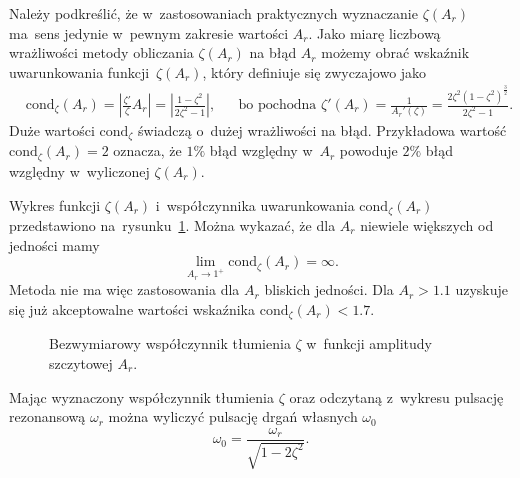 \documentclass[paper=a4,DIV=12]{lpas}
\begin{document}
\begin{appendices}
  Należy podkreślić, że w~zastosowaniach praktycznych wyznaczanie $\zeta(A_r)$
  ma~sens jedynie w~pewnym zakresie wartości $A_r$.
  Jako miarę liczbową wrażliwości metody obliczania $\zeta(A_r)$ na błąd $A_r$
  możemy obrać wskaźnik uwarunkowania funkcji~$\zeta(A_r)$, który definiuje się
  zwyczajowo jako
  \begin{equation}
    \begin{aligned}
      &
      \text{cond}_{\zeta}(A_r)
        = \left|\frac{\zeta'}{\zeta} A_r\right|
        = \left|\frac{1-\zeta^2}{2\zeta^2-1}\right|,
      &&
      \text{bo pochodna }\zeta'(A_r)
        = \frac{1}{A_r'(\zeta)}
        = \frac{2 \zeta^2 (1-\zeta^2)^{\frac{3}{2}}}{2 \zeta^2 - 1}.
      &
    \end{aligned}
    \label{eq:HY93S}
  \end{equation}
  Duże wartości $\text{cond}_{\zeta}$ świadczą o~dużej wrażliwości na błąd.
  Przykładowa wartość $\text{cond}_{\zeta}(A_r) = 2$ oznacza, że $1\%$ błąd
  względny w~$A_r$ powoduje $2\%$ błąd względny w~wyliczonej $\zeta(A_r)$.

  Wykres funkcji $\zeta(A_r)$ i~współczynnika uwarunkowania
  $\text{cond}_{\zeta}(A_r)$ przedstawiono na~rysunku~\ref{fig:5O32M}. Można
  wykazać, że dla $A_r$ niewiele większych od jedności mamy
  \begin{equation}
    \lim_{A_r \to 1^{+}} \text{cond}_{\zeta}(A_r) = \infty.
    \label{eq:77ILN}
  \end{equation}
  Metoda nie ma więc zastosowania dla $A_r$ bliskich jedności. Dla $A_r > 1.1$
  uzyskuje się już akceptowalne wartości wskaźnika $\text{cond}_{\zeta}(A_r) < 1.7$.
  \begin{figure}[H]
    \centering
    
    \caption{Bezwymiarowy współczynnik tłumienia $\zeta$ w~funkcji amplitudy
             szczytowej $A_r$.}
    \label{fig:5O32M}
  \end{figure}

  Mając wyznaczony współczynnik tłumienia $\zeta$ oraz odczytaną z~wykresu
  pulsację rezonansową $\omega_r$ można wyliczyć pulsację drgań własnych
  $\omega_0$
  \begin{equation}
    \omega_0 = \frac{\omega_r}{\sqrt{1 - 2\zeta^2}}.
    \label{eq:GIWGJ}
  \end{equation}


\end{appendices}
\end{document}
